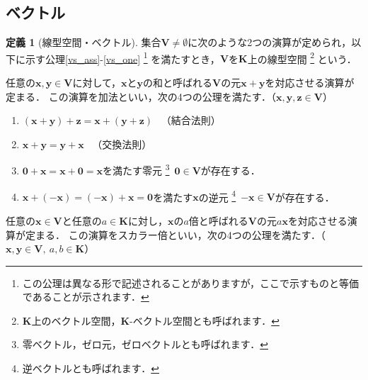 \documentclass[dvipdfmx]{jsarticle}
\theoremstyle{definition}
\newtheorem{definition}{定義}[section]
\begin{document}
\subsection{ベクトル}  \label{subsec_vec}
\begin{definition}[線型空間・ベクトル]
    集合$\bm{V} \neq \emptyset$に次のような2つの演算が定められ，以下に示す公理\ref{vs_ass}-\ref{vs_one}
    \footnote{
        この公理は異なる形で記述されることがありますが，ここで示すものと等価であることが示されます．
    }
    を満たすとき，$\bm{V}$を$\bm{K}$上の線型空間
    \footnote{$\bm{K}$上のベクトル空間，$\bm{K}$-ベクトル空間とも呼ばれます．}
    という．
    \begin{description}
        \setlength{\leftskip}{1em}
        \item[加法]
            任意の$\bm{x}, \bm{y} \in \bm{V}$に対して，$\bm{x}$と$\bm{y}$の和と呼ばれる$\bm{V}$の元$\bm{x} + \bm{y}$を対応させる演算が定まる．
            この演算を加法といい，次の4つの公理を満たす．（$\bm{x}, \bm{y}, \bm{z} \in \bm{V}$）
            \begin{enumerate}
                \setlength{\leftskip}{2em}
                \item $(\bm{x} + \bm{y}) + \bm{z} = \bm{x} + (\bm{y} + \bm{z})$ \ （結合法則）
                    \label{vs_ass}
                \item $\bm{x} + \bm{y} = \bm{y} + \bm{x}$ \ （交換法則）
                    \label{vs_com}
                \item $\bm{0} + \bm{x} = \bm{x} + \bm{0} = \bm{x}$を満たす零元
                    \footnote{零ベクトル，ゼロ元，ゼロベクトルとも呼ばれます．}\
                    $\bm{0} \in \bm{V}$が存在する．
                    \label{vs_zero}
                \item $\bm{x} + (-\bm{x}) = (-\bm{x}) + \bm{x} = \bm{0}$を満たす$\bm{x}$の逆元
                    \footnote{逆ベクトルとも呼ばれます．}\
                    $-\bm{x} \in \bm{V}$が存在する．
                    \label{vs_inv}
            \end{enumerate}
        \item[スカラー倍]
            任意の$\bm{x} \in \bm{V}$と任意の$a \in \bm{K}$に対し，$\bm{x}$の$a$倍と呼ばれる$\bm{V}$の元$a\bm{x}$を対応させる演算が定まる．
            この演算をスカラー倍といい，次の4つの公理を満たす．（$\bm{x}, \bm{y} \in \bm{V}, \ a, b \in \bm{K}$）
            \begin{enumerate}
                \setcounter{enumi}{4}
                \setlength{\leftskip}{2em}

\end{enumerate}
\end{description}
\end{definition}
\end{document}
